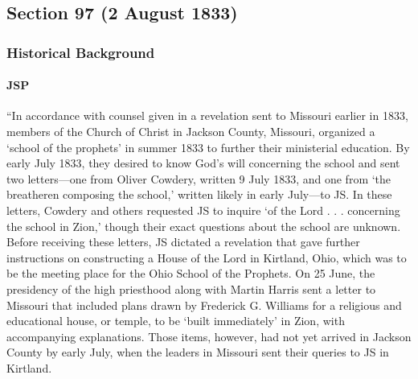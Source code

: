 \subsection{Section 97 (2 August 1833)}
	\label{DC97}
	
	\subsubsection{Historical Background}
		\label{DC97-HB}
		
		\paragraph{JSP}
		
			``In accordance with counsel given in a revelation sent to Missouri earlier in 1833, members of the Church of Christ in Jackson County, Missouri, organized a `school of the prophets' in summer 1833 to further their ministerial education. By early July 1833, they desired to know God's will concerning the school and sent two letters---one from Oliver Cowdery, written 9 July 1833, and one from `the breatheren composing the school,' written likely in early July---to JS. In these letters, Cowdery and others requested JS to inquire `of the Lord . . . concerning the school in Zion,' though their exact questions about the school are unknown. Before receiving these letters, JS dictated a revelation that gave further instructions on constructing a House of the Lord in Kirtland, Ohio, which was to be the meeting place for the Ohio School of the Prophets. On 25 June, the presidency of the high priesthood along with Martin Harris sent a letter to Missouri that included plans drawn by Frederick G. Williams for a religious and educational house, or temple, to be `built immediately' in Zion, with accompanying explanations. Those items, however, had not yet arrived in Jackson County by early July, when the leaders in Missouri sent their queries to JS in Kirtland.
			
